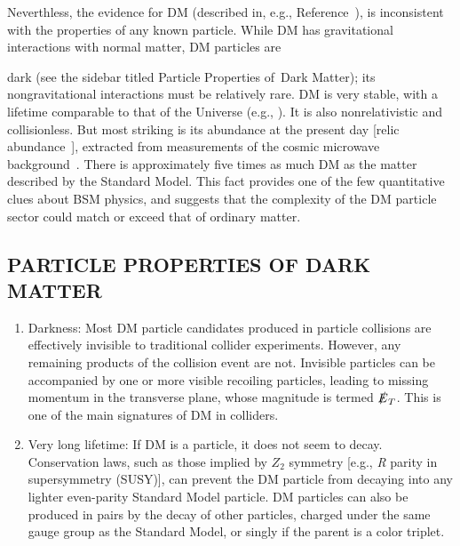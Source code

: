 \documentclass{ar-1col}
\newcommand{\MET}{\ensuremath{\slashed{E}_T}\xspace}
\begin{document}
Neverthless, the evidence for DM (described in, e.g., Reference~), is inconsistent with the properties of any known 
particle. While DM has gravitational interactions with normal matter, DM particles are {dark (see the sidebar titled Particle Properties of\ Dark Matter); its nongravitational
interactions must be relatively rare. DM is very stable, with a lifetime comparable to that of the Universe (e.g., ).
It is also nonrelativistic and collisionless. 
But most striking is its abundance at the present day [relic abundance~\cite{Ellis:1999mm}],
extracted from measurements of the cosmic microwave background~\cite{Ade:2015xua}.
There is approximately five times as much DM as the matter described by the Standard Model. 
This fact provides one of the few quantitative clues about BSM physics, and suggests that 
the complexity of the DM particle sector could match or exceed that of ordinary matter.

\begin{textbox}
\section{PARTICLE PROPERTIES OF DARK MATTER}

\begin{enumerate} 

\item Darkness: Most DM particle candidates produced in particle collisions are effectively invisible to traditional collider experiments. However, any remaining products of the collision event are not. Invisible particles can be
accompanied by one or more visible recoiling particles, leading to
missing momentum in the transverse plane, whose magnitude is
termed \MET. This is one of the main signatures of DM in
colliders.

\item Very long lifetime: If DM is a particle, it does not seem to decay.
Conservation laws, such as those implied by $Z_2$ symmetry [e.g., \textit{R} parity in supersymmetry (SUSY)], 
can prevent the DM particle from decaying into any
lighter even-parity Standard Model particle. DM particles can also be produced in pairs by the decay of other particles, charged
under the same gauge group as the Standard Model, or singly if the
parent is a color triplet.

\end{enumerate} 

\end{textbox}


}
\end{document}
